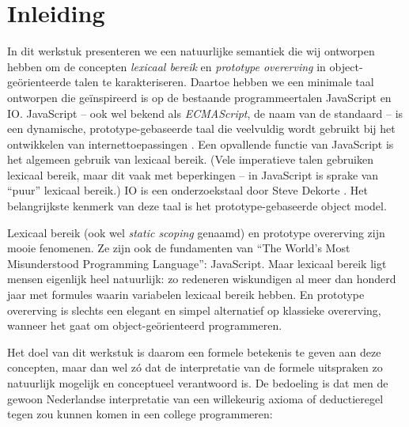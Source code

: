 
\chapter{Inleiding}

In dit werkstuk presenteren we een natuurlijke semantiek die wij ontworpen hebben om de concepten \emph{lexicaal bereik} en \emph{prototype overerving} in object-geörienteerde talen te karakteriseren. Daartoe hebben we een minimale taal ontworpen die geïnspireerd is op de bestaande programmeertalen JavaScript en IO. JavaScript -- ook wel bekend als \emph{ECMAScript}, de naam van de standaard -- is een dynamische, prototype-gebaseerde taal die veelvuldig wordt gebruikt bij het ontwikkelen van internettoepassingen \citep{javascript}. Een opvallende functie van JavaScript is het algemeen gebruik van lexicaal bereik. (Vele imperatieve talen gebruiken lexicaal bereik, maar dit vaak met beperkingen -- in JavaScript is sprake van ``puur'' lexicaal bereik.) IO is een onderzoekstaal door Steve Dekorte \citep{io}. Het belangrijkste kenmerk van deze taal is het prototype-gebaseerde object model.

Lexicaal bereik (ook wel \emph{static scoping} genaamd) en prototype overerving zijn mooie fenomenen. Ze zijn ook de fundamenten van “The World's Most Misunderstood Programming Language”: JavaScript. Maar lexicaal bereik ligt mensen eigenlijk heel natuurlijk: zo redeneren wiskundigen al meer dan honderd jaar met formules waarin variabelen lexicaal bereik hebben. En prototype overerving is slechts een elegant en simpel alternatief op klassieke overerving, wanneer het gaat om object-geörienteerd programmeren.

Het doel van dit werkstuk is daarom een formele betekenis te geven aan deze concepten, maar dan wel zó dat de interpretatie van de formele uitspraken zo natuurlijk mogelijk en conceptueel verantwoord is. De bedoeling is dat men de gewoon Nederlandse interpretatie van een willekeurig axioma of deductieregel tegen zou kunnen komen in een college programmeren:

